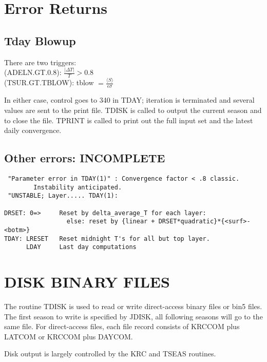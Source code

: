 \documentclass[draft]{article}  %
\newcommand{\qi}{\\ \hspace*{2.em}}      %
\begin{document}
\section{Error Returns} %
\subsection{Tday Blowup} %
There are two triggers:
\qi  (ADELN.GT.0.8):  $\frac{ | \Delta T |}{T} > 0.8$ 
\qi (TSUR.GT.TBLOW): tblow $= \frac{\langle S \rangle}{\epsilon \sigma}$

In either case, control goes to 340 in TDAY; iteration is terminated and several values are sent to the print file. TDISK is called to output the current season and to close the file. TPRINT is called to print out the full input set and the latest daily convergence.   

\subsection{Other errors: INCOMPLETE} %
\vspace{-3.mm} 
\begin{verbatim}
 "Parameter error in TDAY(1)" : Convergence factor < .8 classic. 
        Instability anticipated.  
 "UNSTABLE; Layer..... TDAY(1): 

DRSET: 0=>     Reset by delta_average_T for each layer:
                 else: reset by {linear + DRSET*quadratic}*{<surf>-<botm>}
TDAY: LRESET   Reset midnight T's for all but top layer.
      LDAY     Last day computations
\end{verbatim}


\section{DISK BINARY FILES \label{dbf} } %

The routine TDISK is used to read or write direct-access binary files or bin5
files. The first season to write is specified by JDISK, all following seasons
will go to the same file. For direct-access files, each file record consists of
KRCCOM plus LATCOM or KRCCOM plus DAYCOM.

Disk output is largely controlled by the KRC and TSEAS routines.
\end{document}
